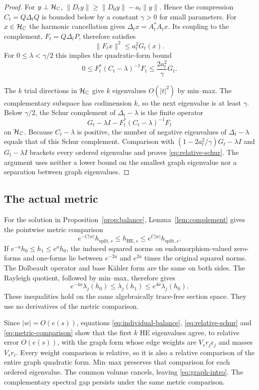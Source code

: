 \begin{proof}
For $y\perp\mathcal H_\mathbb C$,
$\|D_ty\|\ge\|D_0y\|-a_t\|y\|$. Hence the compression
$C_t=Q\Delta_tQ$ is bounded below by a constant $\gamma>0$ for
small parameters. For $x\in\mathcal H_\mathbb C$ the harmonic cancellation
gives $\Delta_tx=A_t^*A_tx$. Its coupling to the complement,
$F_t=Q\Delta_tP$, therefore satisfies
\[
 \|F_tx\|^2\le a_t^2G_t(x).
\]
For $0\le\lambda<\gamma/2$ this implies the quadratic-form bound
\begin{equation}\label{eq:schur-form-bound}
 0\le F_t^*(C_t-\lambda)^{-1}F_t
       \le\frac{2a_t^2}{\gamma}G_t.
\end{equation}

The $k$ trial directions in $\mathcal H_\mathbb C$ give $k$ eigenvalues
$O(|t|^2)$ by min--max. The complementary subspace has codimension
$k$, so the next eigenvalue is at least $\gamma$. Below $\gamma/2$,
the Schur complement of $\Delta_t-\lambda$ is the finite operator
\[
 G_t-\lambda I-F_t^*(C_t-\lambda)^{-1}F_t
\]
on $\mathcal H_\mathbb C$. Because $C_t-\lambda$ is positive, the number of
negative eigenvalues of $\Delta_t-\lambda$ equals that of this
Schur complement. Comparison with
$(1-2a_t^2/\gamma)G_t-\lambda I$ and $G_t-\lambda I$ brackets
every ordered eigenvalue and proves \eqref{eq:relative-schur}.
The argument uses neither a lower bound on the smallest graph
eigenvalue nor a separation between graph eigenvalues.
\end{proof}

\subsection{The actual metric}
For the solution in Proposition~\ref{prop:balance},
Lemma~\ref{lem:complement} gives the pointwise metric comparison
\[
 e^{-C|w|}h_{\mathrm{split},s}\le h_{\mathrm{HE},s}
       \le e^{C|w|}h_{\mathrm{split},s}.
\]
If $e^{-a}h_0\le h_1\le e^ah_0$, the induced squared norms on
endomorphism-valued zero-forms and one-forms lie between $e^{-2a}$
and $e^{2a}$ times the original squared norms. The Dolbeault operator
and base K\"ahler form are the same on both sides. The Rayleigh
quotient, followed by min--max, therefore gives
\begin{equation}\label{eq:metric-comparison}
 e^{-4a}\lambda_j(h_0)\le\lambda_j(h_1)\le e^{4a}\lambda_j(h_0).
\end{equation}
These inequalities hold on the same algebraically trace-free section
space. They use no derivatives of the metric comparison.

Since $|w|=O(e(s))$, equations \eqref{eq:individual-balance},
\eqref{eq:relative-schur} and \eqref{eq:metric-comparison} show that
the first $k$ HE eigenvalues agree, to relative error $O(e(s))$,
with the graph form whose edge weights are $V_sr_j\epsilon_j$
and masses $V_sr_i$. Every weight comparison is relative, so it is
also a relative comparison of the entire graph quadratic form.
Min--max preserves that comparison for each ordered eigenvalue.
The common volume cancels, leaving \eqref{eq:graph-intro}.
The complementary spectral gap persists under the same metric
comparison.

